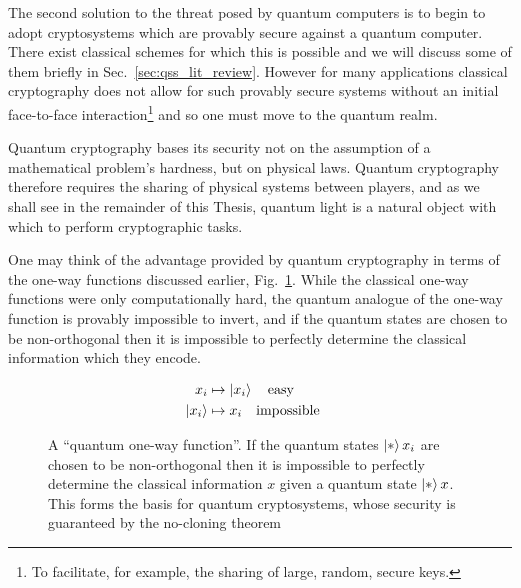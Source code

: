 The second solution to the threat posed by quantum computers is to begin to adopt cryptosystems which are provably secure against a quantum computer. There exist classical schemes for which this is possible and we will discuss some of them briefly in Sec.~\ref{sec:qss_lit_review}. However for many applications classical cryptography does not allow for such provably secure systems without an initial face-to-face interaction\footnote{To facilitate, for example, the sharing of large, random, secure keys.} and so one must move to the quantum realm.

Quantum cryptography bases its security not on the assumption of a mathematical problem's hardness, but on physical laws. Quantum cryptography therefore requires the sharing of physical systems between players, and as we shall see in the remainder of this Thesis, quantum light is a natural object with which to perform cryptographic tasks. 

One may think of the advantage provided by quantum cryptography in terms of the one-way functions discussed earlier, Fig.~\ref{fig:qutrapdoor}. While the classical one-way functions were only computationally hard, the quantum analogue of the one-way function is provably impossible to invert, and if the quantum states are chosen to be non-orthogonal then it is impossible to perfectly determine the classical information which they encode. 

\begin{figure}[h!]
\centering
\begin{framed}
\begin{align*}
x_i &\mapsto \ket{x_i} \qq{easy}\\
\ket{x_i} &\mapsto x_i \qq{impossible}
\end{align*}
\caption{A ``quantum one-way function''. If the quantum states $\ket*{x_i}$ are chosen to be non-orthogonal then it is impossible to perfectly determine the classical information $x$ given a quantum state $\ket*{x}$. This forms the basis for quantum cryptosystems, whose security is guaranteed by the no-cloning theorem}
\label{fig:qutrapdoor}
\end{framed}
\end{figure}

\clearpage






